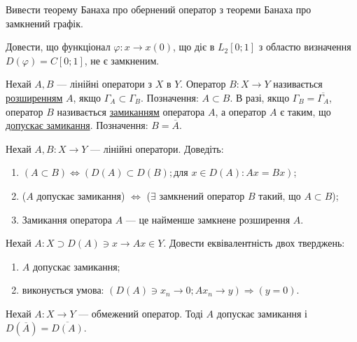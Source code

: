 \begin{exercise}
    Вивести теорему Банаха про обернений оператор з теореми Банаха про 
    замкнений графік.
\end{exercise}

\begin{exercise}
    Довести, що функціонал $\varphi: x \rightarrow x(0)$, що діє в 
    $L_2[0; 1]$ з областю визначення $D(\varphi) = C[0; 1]$, не є 
    замкненим.
\end{exercise}

\begin{theory}
    Нехай $A, B$ --- лінійні оператори з $X$ в $Y$. Оператор $B: X 
    \rightarrow Y$ називається \ul{розширенням} $A$, якщо $\Gamma_A 
    \subset \Gamma_B$. Позначення: $A \subset B$. В разі, якщо 
    $\Gamma_B = \overline{\Gamma_A}$, оператор $B$ називається 
    \ul{замиканням} оператора $A$, а оператор $A$ є таким, що 
    \ul{допускає замикання}. Позначення: $B = \overline{A}$.
\end{theory}

\begin{exercise}
    Нехай $A, B: X \rightarrow Y$ --- лінійні оператори. Доведіть:
    \begin{enumerate}
        \item $(A \subset B) \Leftrightarrow (D(A) \subset D(B); 
        \text{для }x \in D(A): Ax = Bx)$;
        \item ($A$ допускає замикання) $\Leftrightarrow$ ($\exists$ 
        замкнений оператор $B$ такий, що $A \subset B$);
        \item Замикання оператора $A$ --- це найменше замкнене 
        розширення $A$.
    \end{enumerate}
\end{exercise}

\begin{exercise}
    Нехай $A: X \supset D(A) \ni x \rightarrow Ax \in Y$. Довести 
    еквівалентність двох тверджень:
    \begin{enumerate}
        \item $A$ допускає замикання;
        \item виконується умова: $(D(A) \ni x_n \rightarrow 0; 
        Ax_n \rightarrow y) \Rightarrow (y = 0)$.
    \end{enumerate}
\end{exercise}

\begin{exercise}
    Нехай $A: X \rightarrow Y$ --- обмежений оператор. Тоді $A$ допускає 
    замикання і $D(\overline{A}) = \overline{D(A)}$.
\end{exercise}

